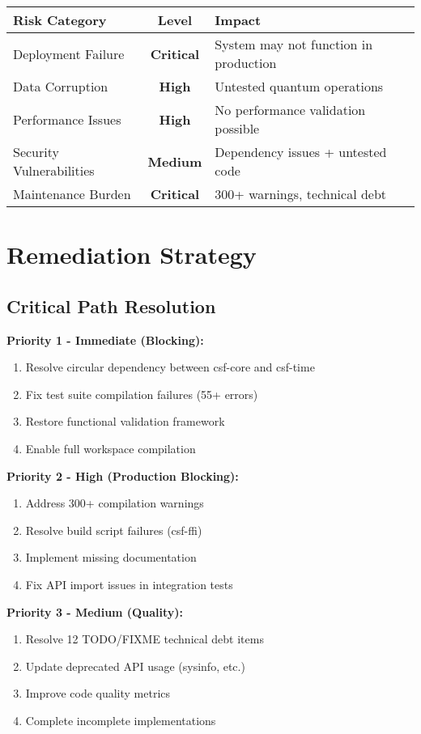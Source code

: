 \documentclass[11pt,a4paper]{article}
\newcommand{\critical}[1]{\textcolor{criticalred}{\textbf{#1}}}
\newcommand{\warning}[1]{\textcolor{warningorange}{\textbf{#1}}}
\begin{document}
\begin{center}
\begin{tabular}{|l|c|l|}
\hline
\textbf{Risk Category} & \textbf{Level} & \textbf{Impact} \\
\hline
Deployment Failure & \critical{Critical} & System may not function in production \\
Data Corruption & \warning{High} & Untested quantum operations \\
Performance Issues & \warning{High} & No performance validation possible \\
Security Vulnerabilities & \warning{Medium} & Dependency issues + untested code \\
Maintenance Burden & \critical{Critical} & 300+ warnings, technical debt \\
\hline
\end{tabular}
\end{center}

\section{Remediation Strategy}

\subsection{Critical Path Resolution}

\textbf{Priority 1 - Immediate (Blocking):}
\begin{enumerate}
    \item Resolve circular dependency between csf-core and csf-time
    \item Fix test suite compilation failures (55+ errors)
    \item Restore functional validation framework
    \item Enable full workspace compilation
\end{enumerate}

\textbf{Priority 2 - High (Production Blocking):}
\begin{enumerate}
    \item Address 300+ compilation warnings
    \item Resolve build script failures (csf-ffi)
    \item Implement missing documentation
    \item Fix API import issues in integration tests
\end{enumerate}

\textbf{Priority 3 - Medium (Quality):}
\begin{enumerate}
    \item Resolve 12 TODO/FIXME technical debt items
    \item Update deprecated API usage (sysinfo, etc.)
    \item Improve code quality metrics
    \item Complete incomplete implementations
\end{enumerate}
\end{document}
